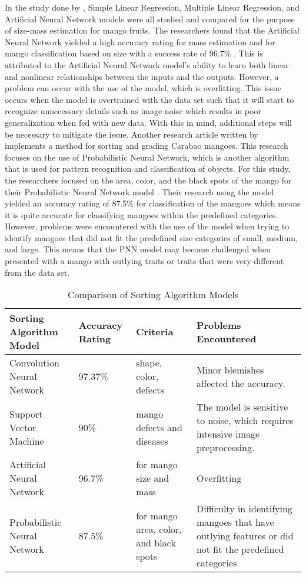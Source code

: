 In the study done by \citet{schulze-development-2015}, Simple
Linear Regression, Multiple Linear Regression, and Artificial Neural Network models
were all studied and compared for the purpose of size-mass estimation for mango fruits.
The researchers found that the Artificial Neural Network yielded a high accuracy rating
for mass estimation and for mango classification based on size with a success rate of
96.7\% \citep{schulze-development-2015}. This is attributed to the Artificial Neural Network model’s ability to learn both
linear and nonlinear relationships between the inputs and the outputs. However, a
problem can occur with the use of the model, which is overfitting. This issue occurs
when the model is overtrained with the data set such that it will start to recognize
unnecessary details such as image noise which results in poor generalization when fed
with new data. With this in mind, additional steps will be necessary to mitigate the issue.
Another research article written by \citet{alejandro-grading-2018}
implements a method for sorting and grading Carabao mangoes. This research focuses
on the use of Probabilistic Neural Network, which is another algorithm that is used for
pattern recognition and classification of objects. For this study, the researchers focused
on the area, color, and the black spots of the mango for their Probabilistic Neural
Network model \citep{alejandro-grading-2018}. Their research using the model yielded an accuracy rating of 87.5\% for
classification of the mangoes which means it is quite accurate for classifying mangoes
within the predefined categories. However, problems were encountered with the use of
the model when trying to identify mangoes that did not fit the predefined size categories
of small, medium, and large. This means that the PNN model may become challenged
when presented with a mango with outlying traits or traits that were very different from
the data set.

\begin{table}[h]
	\centering
	\caption{Comparison of Sorting Algorithm Models}
	\label{tab:sorting_algorithm_models}
	\renewcommand{\arraystretch}{1.3} %
	\begin{tabular}{p{}|p{}|p{}|p{}}
		\hline
		\textbf{Sorting Algorithm Model} & \textbf{Accuracy Rating} & \textbf{Criteria} & \textbf{Problems Encountered} \\
		\hline
		Convolution Neural Network & 97.37\% & shape, color, defects & Minor blemishes affected the accuracy. \\
		\hline
		Support Vector Machine & 90\% & mango defects and diseases & The model is sensitive to noise, which requires intensive image preprocessing. \\
		\hline
		Artificial Neural Network & 96.7\% & for mango size and mass & Overfitting \\
		\hline
		Probabilistic Neural Network & 87.5\% & for mango area, color, and black spots & Difficulty in identifying mangoes that have outlying features or did not fit the predefined 		categories \\
		\hline
	\end{tabular}
\end{table}

